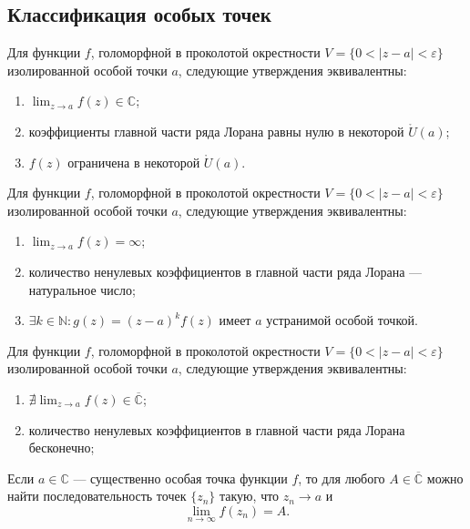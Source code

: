 \subsection{Классификация особых точек}

\begin{theorem}
Для функции $f$, голоморфной в проколотой окрестности $V = \{0 < |z - a| < \varepsilon\}$ изолированной особой точки $a$, следующие утверждения эквивалентны:
\begin{enumerate}
    \item $\lim_{z\to a}f(z)\in\mathbb{C}$;
    \item коэффициенты главной части ряда Лорана равны нулю в некоторой $\mathring{U}(a)$;
    \item $f(z)$ ограничена в некоторой $\mathring{U}(a)$.
\end{enumerate}
\end{theorem}

\begin{theorem}
Для функции $f$, голоморфной в проколотой окрестности $V = \{0 < |z - a| < \varepsilon\}$ изолированной особой точки $a$, следующие утверждения эквивалентны:
\begin{enumerate}
    \item $\lim_{z\to a}f(z)=\infty$;
    \item количество ненулевых коэффициентов в главной части ряда Лорана --- натуральное число;
    \item $\exists k\in\mathbb{N}\colon g(z)=(z-a)^kf(z)$ имеет $a$ устранимой особой точкой.
\end{enumerate}
\end{theorem}

\begin{theorem}
Для функции $f$, голоморфной в проколотой окрестности $V = \{0 < |z - a| < \varepsilon\}$ изолированной особой точки $a$, следующие утверждения эквивалентны:
\begin{enumerate}
    \item $\nexists\lim_{z\to a}f(z)\in\overline{\mathbb{C}}$;
    \item количество ненулевых коэффициентов в главной части ряда Лорана бесконечно;
\end{enumerate}
\end{theorem}

\begin{theorem}[Сохоцкого]
Если $a \in \mathbb{C}$ --- существенно особая точка функции $f$, то для любого $A \in \overline{\mathbb{C}}$ можно найти последовательность точек $\{z_n\}$ такую, что $z_n \to a$ и
\[
\lim_{n \to \infty} f(z_n) = A.
\]
\end{theorem}

